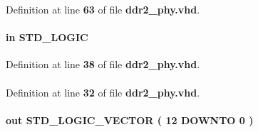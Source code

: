 Definition at line {\bf 63} of file {\bf ddr2\+\_\+phy.\+vhd}.

\paragraph[{global\+\_\+reset\+\_\+n}]{ {\bfseries \textcolor{keywordflow}{in}\textcolor{vhdlchar}{ }} {\bfseries \textcolor{comment}{S\+T\+D\+\_\+\+L\+O\+G\+IC}\textcolor{vhdlchar}{ }} \hspace{0.3cm}{\ttfamily [Port]}}\label{classddr2__phy_af7e9fe89a5a1946a55cb9769dee37a11}


Definition at line {\bf 38} of file {\bf ddr2\+\_\+phy.\+vhd}.

\paragraph[{I\+E\+EE}]{\hspace{0.3cm}{\ttfamily [Library]}}\label{classddr2__phy_ae4f03c286607f3181e16b9aa12d0c6d4}


Definition at line {\bf 32} of file {\bf ddr2\+\_\+phy.\+vhd}.

\paragraph[{mem\+\_\+addr}]{ {\bfseries \textcolor{keywordflow}{out}\textcolor{vhdlchar}{ }} {\bfseries \textcolor{comment}{S\+T\+D\+\_\+\+L\+O\+G\+I\+C\+\_\+\+V\+E\+C\+T\+OR}\textcolor{vhdlchar}{ }\textcolor{vhdlchar}{(}\textcolor{vhdlchar}{ }\textcolor{vhdlchar}{ } \textcolor{vhdldigit}{12} \textcolor{vhdlchar}{ }\textcolor{keywordflow}{D\+O\+W\+N\+TO}\textcolor{vhdlchar}{ }\textcolor{vhdlchar}{ } \textcolor{vhdldigit}{0} \textcolor{vhdlchar}{ }\textcolor{vhdlchar}{)}\textcolor{vhdlchar}{ }} \hspace{0.3cm}{\ttfamily [Port]}}\label{classddr2__phy_a6ebd63d6ab445edbfddde13873c36097}


